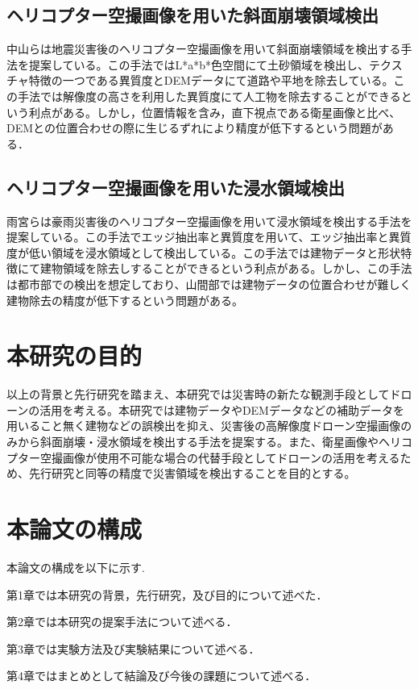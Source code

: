 \documentclass[../Thesis]{subfiles}
\begin{document}

\subsection{ヘリコプター空撮画像を用いた斜面崩壊領域検出}
  中山ら\cite{art02}は地震災害後のヘリコプター空撮画像を用いて斜面崩壊領域を検出する手法を提案している。この手法ではL*a*b*色空間\cite{}にて土砂領域を検出し、テクスチャ特徴の一つである異質度\cite{}とDEMデータにて道路や平地を除去している。この手法では解像度の高さを利用した異質度にて人工物を除去することができるという利点がある。しかし，位置情報を含み，直下視点である衛星画像と比べ、DEMとの位置合わせの際に生じるずれにより精度が低下するという問題がある．

\subsection{ヘリコプター空撮画像を用いた浸水領域検出}
  雨宮ら\cite{art03}は豪雨災害後のヘリコプター空撮画像を用いて浸水領域を検出する手法を提案している。この手法でエッジ抽出率\cite{}と異質度を用いて、エッジ抽出率と異質度が低い領域を浸水領域として検出している。この手法では建物データと形状特徴にて建物領域を除去しすることができるという利点がある。しかし、この手法は都市部での検出を想定しており、山間部では建物データの位置合わせが難しく建物除去の精度が低下するという問題がある。


\section{本研究の目的} 
  以上の背景と先行研究を踏まえ、本研究では災害時の新たな観測手段としてドローンの活用を考える。本研究では建物データやDEMデータなどの補助データを用いること無く建物などの誤検出を抑え、災害後の高解像度ドローン空撮画像のみから斜面崩壊・浸水領域を検出する手法を提案する。また、衛星画像やヘリコプター空撮画像が使用不可能な場合の代替手段としてドローンの活用を考えるため、先行研究と同等の精度で災害領域を検出することを目的とする。


\section{本論文の構成}
  \label{sec:本論文の構成}
  本論文の構成を以下に示す. \par
  第1章では本研究の背景，先行研究，及び目的について述べた．\par
  第2章では本研究の提案手法について述べる．\par
  第3章では実験方法及び実験結果について述べる．\par
  第4章ではまとめとして結論及び今後の課題について述べる．
\end{document}

